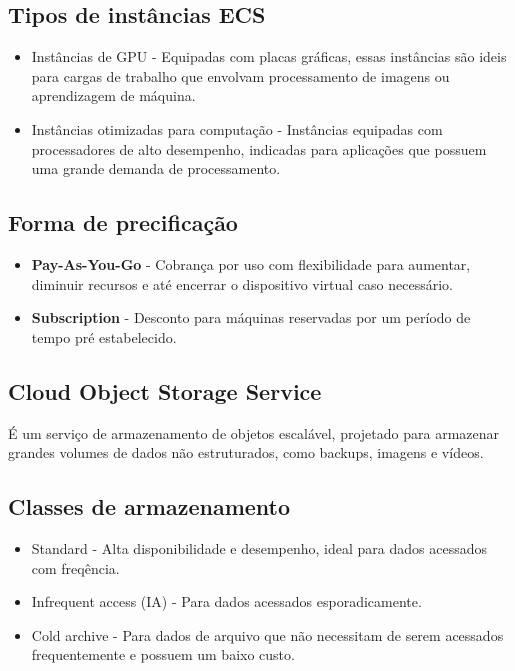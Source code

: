 \documentclass[a4paper,12pt]{article}
\begin{document}
\subsection*{Tipos de instâncias ECS}

\begin{itemize}
  \item{Instâncias de GPU} - Equipadas com placas gráficas, essas instâncias são ideis para cargas de trabalho que envolvam processamento de imagens ou aprendizagem de máquina.
  \item{Instâncias otimizadas para computação} - Instâncias equipadas com processadores de alto desempenho, indicadas para aplicações que possuem uma grande demanda de processamento.
\end{itemize}

\subsection*{Forma de precificação}
\begin{itemize}
  \item\textbf{Pay-As-You-Go} - Cobrança por uso com flexibilidade para aumentar, diminuir recursos e até encerrar o dispositivo virtual caso necessário.
  \item\textbf{Subscription} - Desconto para máquinas reservadas por um período de tempo pré estabelecido.
\end{itemize}

\subsection*{Cloud Object Storage Service}
É um serviço de armazenamento de objetos escalável, projetado para armazenar grandes volumes de dados não estruturados, como backups, imagens e vídeos.

\subsection*{Classes de armazenamento}
\begin{itemize}
  \item Standard - Alta disponibilidade e desempenho, ideal para dados acessados com freqência.
  \item Infrequent access (IA) - Para dados acessados esporadicamente.
  \item Cold archive - Para dados de arquivo que não necessitam de serem acessados frequentemente e possuem um baixo custo.
\end{itemize}
\end{document}
